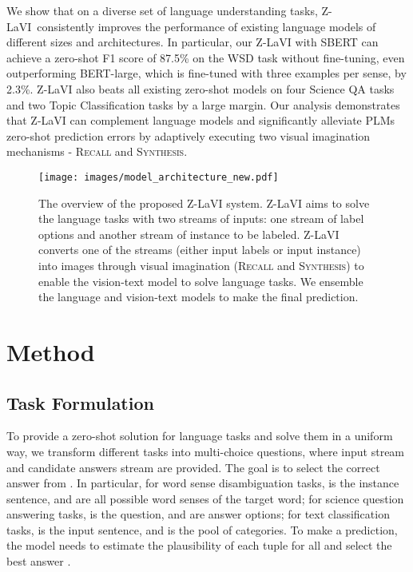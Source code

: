 \documentclass[11pt]{article}
\newcommand{\model}{Z-LaVI}
\begin{document}
We show that on a diverse set of language understanding tasks, \model~consistently improves the performance of existing language models of different sizes and architectures. In particular, our Z-LaVI with SBERT can achieve a zero-shot F1 score of 87.5\% on the WSD task without fine-tuning, even outperforming BERT-large, which is fine-tuned with three examples per sense, by 2.3\%. Z-LaVI also beats all existing zero-shot models on four Science QA tasks and two Topic Classification tasks by a large margin.
Our analysis demonstrates that Z-LaVI can complement language models and significantly alleviate PLMs zero-shot prediction errors by adaptively executing two visual imagination mechanisms - \textsc{Recall} and \textsc{Synthesis}.




\begin{figure}[!t]
\centering
    \texttt{[image: images/model\_architecture\_new.pdf]}
    \caption{The overview of the proposed Z-LaVI system. Z-LaVI aims to solve the language tasks with two streams of inputs: one stream of label options and another stream of instance to be labeled. Z-LaVI converts one of the streams (either input labels or input instance) into images through visual imagination (\textsc{Recall} and \textsc{Synthesis}) to enable the vision-text model to solve language tasks. We ensemble the language and vision-text models to make the final prediction.}
    \label{fig:model}
\end{figure}

\section{Method}
\subsection{Task Formulation}
To provide a zero-shot solution for language tasks and solve them in a uniform way, we transform different tasks into multi-choice questions, where input stream  and candidate answers stream  are provided. The goal is to select the correct answer from .
In particular, for word sense disambiguation tasks,  is the instance sentence, and  are all possible word senses of the target word; for science question answering tasks,  is the question, and  are answer options; for text classification tasks,  is the input sentence, and  is the pool of categories.
To make a prediction, the model needs to estimate the plausibility of each tuple  for all  and select the best answer .
\end{document}
